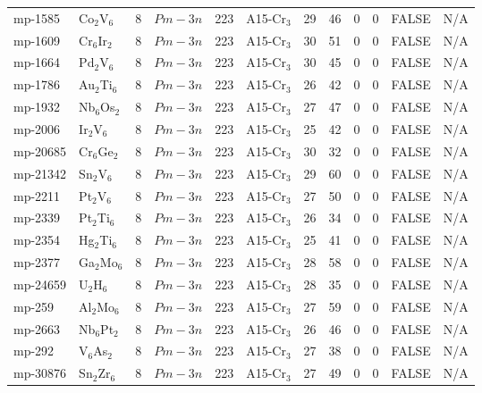 {\begin{longtable}{llcccccccccc}
    mp-1585 & Co$_{2}$V$_{6}$ & 8     & $Pm-3n$ & 223   & A15-Cr$_{3}$ & 29    & 46    & 0     & 0     & FALSE & N/A \\
    mp-1609 & Cr$_{6}$Ir$_{2}$ & 8     & $Pm-3n$ & 223   & A15-Cr$_{3}$ & 30    & 51    & 0     & 0     & FALSE & N/A \\
    mp-1664 & Pd$_{2}$V$_{6}$ & 8     & $Pm-3n$ & 223   & A15-Cr$_{3}$ & 30    & 45    & 0     & 0     & FALSE & N/A \\
    mp-1786 & Au$_{2}$Ti$_{6}$ & 8     & $Pm-3n$ & 223   & A15-Cr$_{3}$ & 26    & 42    & 0     & 0     & FALSE & N/A \\
    mp-1932 & Nb$_{6}$Os$_{2}$ & 8     & $Pm-3n$ & 223   & A15-Cr$_{3}$ & 27    & 47    & 0     & 0     & FALSE & N/A \\
    mp-2006 & Ir$_{2}$V$_{6}$ & 8     & $Pm-3n$ & 223   & A15-Cr$_{3}$ & 25    & 42    & 0     & 0     & FALSE & N/A \\
    mp-20685 & Cr$_{6}$Ge$_{2}$ & 8     & $Pm-3n$ & 223   & A15-Cr$_{3}$ & 30    & 32    & 0     & 0     & FALSE & N/A \\
    mp-21342 & Sn$_{2}$V$_{6}$ & 8     & $Pm-3n$ & 223   & A15-Cr$_{3}$ & 29    & 60    & 0     & 0     & FALSE & N/A \\
    mp-2211 & Pt$_{2}$V$_{6}$ & 8     & $Pm-3n$ & 223   & A15-Cr$_{3}$ & 27    & 50    & 0     & 0     & FALSE & N/A \\
    mp-2339 & Pt$_{2}$Ti$_{6}$ & 8     & $Pm-3n$ & 223   & A15-Cr$_{3}$ & 26    & 34    & 0     & 0     & FALSE & N/A \\
    mp-2354 & Hg$_{2}$Ti$_{6}$ & 8     & $Pm-3n$ & 223   & A15-Cr$_{3}$ & 25    & 41    & 0     & 0     & FALSE & N/A \\
    mp-2377 & Ga$_{2}$Mo$_{6}$ & 8     & $Pm-3n$ & 223   & A15-Cr$_{3}$ & 28    & 58    & 0     & 0     & FALSE & N/A \\
    mp-24659 & U$_{2}$H$_{6}$ & 8     & $Pm-3n$ & 223   & A15-Cr$_{3}$ & 28    & 35    & 0     & 0     & FALSE & N/A \\
    mp-259 & Al$_{2}$Mo$_{6}$ & 8     & $Pm-3n$ & 223   & A15-Cr$_{3}$ & 27    & 59    & 0     & 0     & FALSE & N/A \\
    mp-2663 & Nb$_{6}$Pt$_{2}$ & 8     & $Pm-3n$ & 223   & A15-Cr$_{3}$ & 26    & 46    & 0     & 0     & FALSE & N/A \\
    mp-292 & V$_{6}$As$_{2}$ & 8     & $Pm-3n$ & 223   & A15-Cr$_{3}$ & 27    & 38    & 0     & 0     & FALSE & N/A \\
    mp-30876 & Sn$_{2}$Zr$_{6}$ & 8     & $Pm-3n$ & 223   & A15-Cr$_{3}$ & 27    & 49    & 0     & 0     & FALSE & N/A \\

\end{longtable}}
